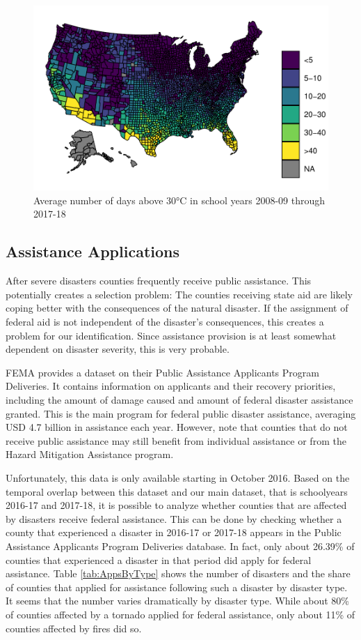 \begin{figure}[!h]
	\centering
	\includegraphics[scale=1]{"../Code & Data/HeatMapDays.pdf"}
	\caption{Average number of days above 30°C in school years 2008-09 through 2017-18}
	\label{HeatMapDays}
\end{figure}


\subsection{Assistance Applications}

After severe disasters counties frequently receive public assistance. This potentially creates a selection problem: The counties receiving state aid are likely coping better with the consequences of the natural disaster. If the assignment of federal aid is not independent of the disaster's consequences, this creates a problem for our identification. Since assistance provision is at least somewhat dependent on disaster severity, this is very probable.

FEMA provides a dataset on  their Public Assistance Applicants Program Deliveries. It contains information on applicants and their recovery priorities, including the amount of damage caused and amount of federal disaster assistance granted. This is the main program for federal public disaster assistance, averaging USD 4.7 billion in assistance each year. However, note that counties that do not receive public assistance may still benefit from individual assistance or from the Hazard Mitigation Assistance program.

Unfortunately, this data is only available starting in October 2016. Based on the temporal overlap between this dataset and our main dataset, that is schoolyears 2016-17 and 2017-18, it is possible to analyze whether counties that are affected by disasters receive federal assistance. This can be done by checking whether a county that experienced a disaster in 2016-17 or 2017-18 appears in the Public Assistance Applicants Program Deliveries database. In fact, only about 26.39\% of counties that experienced a disaster in that period did apply for federal assistance. Table \ref{tab:AppsByType} shows the number of disasters and the share of counties that applied for assistance following such a disaster by disaster type. It seems that the number varies dramatically by disaster type. While about 80\% of counties affected by a tornado applied for federal assistance, only about 11\% of counties affected by fires did so.

